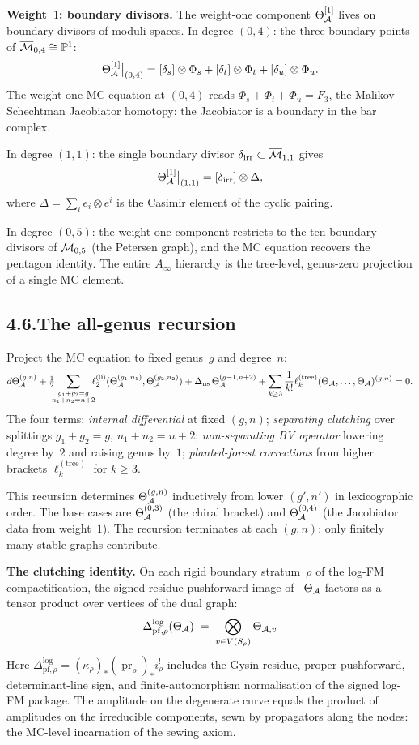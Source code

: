 \medskip

\noindent\textbf{Weight~$1$: boundary divisors.}\enspace
The weight-one component $\Theta^{[1]}_{\mathcal{A}}$ lives on boundary
divisors of moduli spaces. In degree $(0,4)$: the three boundary
points of $\overline{\mathcal{M}}_{0,4}\cong\mathbb P^1$:
\[
\Theta^{[1]}_{\mathcal{A}}\big|_{(0,4)}
=[\delta_s]\otimes\Phi_s
+[\delta_t]\otimes\Phi_t
+[\delta_u]\otimes\Phi_u.
\]
The weight-one MC equation at $(0,4)$ reads
$\Phi_s+\Phi_t+\Phi_u=F_3$,
the Malikov--Schechtman Jacobiator homotopy: the Jacobiator is a
boundary in the bar complex.

In degree $(1,1)$: the single boundary divisor
$\delta_{\mathrm{irr}}\subset\overline{\mathcal{M}}_{1,1}$ gives
\[
\Theta^{[1]}_{\mathcal{A}}\big|_{(1,1)}
=[\delta_{\mathrm{irr}}]\otimes\Delta,
\]
where $\Delta=\sum_i e_i\otimes e^i$ is the Casimir element of the
cyclic pairing.

In degree $(0,5)$: the weight-one component restricts to the ten
boundary divisors of $\overline{\mathcal{M}}_{0,5}$ (the Petersen graph),
and the MC equation recovers the pentagon identity. The entire
$A_\infty$ hierarchy is the tree-level, genus-zero projection of a
single MC element.

\subsection*{4.6.\enspace The all-genus recursion}

Project the MC equation to fixed genus~$g$ and degree~$n$:
\[
d\Theta^{(g,n)}_{\mathcal{A}}
+\tfrac12
\!\!\!
\sum_{\substack{g_1+g_2=g\\n_1+n_2=n+2}}
\!\!\!
\ell_2^{(0)}(\Theta^{(g_1,n_1)}_{\mathcal{A}},\Theta^{(g_2,n_2)}_{\mathcal{A}})
+\Delta_{\mathrm{ns}}\,\Theta^{(g-1,n+2)}_{\mathcal{A}}
+\sum_{k\ge 3}\frac{1}{k!}
\ell_k^{(\mathrm{tree})}(\Theta_{\mathcal{A}},\dots,\Theta_{\mathcal{A}})^{(g,n)}
=0.
\]
The four terms: \emph{internal differential} at fixed $(g,n)$;
\emph{separating clutching} over splittings $g_1+g_2=g$,
$n_1+n_2=n+2$; \emph{non-separating BV operator} lowering degree
by~$2$ and raising genus by~$1$; \emph{planted-forest corrections}
from higher brackets $\ell_k^{(\mathrm{tree})}$ for $k\ge 3$.

This recursion determines $\Theta^{(g,n)}_{\mathcal{A}}$ inductively from
lower $(g',n')$ in lexicographic order. The base cases are
$\Theta^{(0,3)}_{\mathcal{A}}$ (the chiral bracket) and
$\Theta^{(0,4)}_{\mathcal{A}}$ (the Jacobiator data from weight~$1$).
The recursion terminates at each $(g,n)$: only finitely many stable
graphs contribute.

\medskip
\noindent\textbf{The clutching identity.}\enspace
On each rigid boundary stratum~$\rho$ of the log-FM
compactification, the signed residue-pushforward image of
~$\Theta_{\mathcal{A}}$ factors as a tensor product over vertices of the dual
graph:
\[
\Delta^{\log}_{\mathrm{pf},\rho}(\Theta_{\mathcal{A}})
\;=\;
\bigotimes_{v\in V(S_\rho)}\Theta_{\mathcal{A},v}
\]
Here
$\Delta^{\log}_{\mathrm{pf},\rho}
=(\kappa_\rho)_*(\operatorname{pr}_\rho)_*i_\rho^!$ includes the
Gysin residue, proper pushforward, determinant-line sign, and
finite-automorphism normalisation of the signed log-FM package.
The amplitude on the degenerate curve equals the product
of amplitudes on the irreducible components, sewn by propagators
along the nodes: the MC-level incarnation of the sewing axiom.

